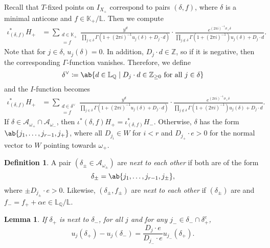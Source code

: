 \documentclass[leqno, openany]{memoir}
\newtheorem{lem}[thm]{Lemma}
\theoremstyle{definition}
\newtheorem{defn}[thm]{Definition}
\theoremstyle{remark}
\theoremstyle{plain}
\theoremstyle{definition}
\theoremstyle{remark}
\newcommand{\Z}{\mathbb{Z}}
\newcommand{\Q}{\mathbb{Q}}
\newcommand{\K}{\mathbb{K}}
\renewcommand{\L}{\mathbb{L}}
\newcommand{\mc}[1]{\mathcal{#1}}
\begin{document}
Recall that $T$-fixed points on $I_{X_+}$ correspond to pairs $(\delta, f)$, where $\delta$ is a minimal anticone and $f \in \K_+/\L$. Then we compute
\begin{align*}
    \iota^*_{(\delta, f)} H_+ &= \sum_{\substack{d \in \K_+ \\ [d] = f}} \frac{y^d}{\prod_{j \in \delta} \Gamma(1 + (2\pi i)^{-1}u_j ( \delta ) + D_j \cdot d)} \cdot \frac{e^{(2\pi i)^{-1} \sigma_+ \delta}}{\prod_{j \notin \delta} \Gamma(1 + (2\pi i)^{-1})u_j(\delta) + D_j \cdot d}.
\end{align*}
Note that for $j \in \delta$, $u_j(\delta) = 0$. In addition, $D_j \cdot d \in \Z$, so if it is negative, then the corresponding $\Gamma$-function vanishes. Therefore, we define
\[ \delta^{\vee} \coloneqq \ab\{d \in \L_{\Q} \mid D_j \cdot d \in \Z_{\geq 0} \text{ for all } j \in \delta\} \]
and the $I$-function becomes
\begin{align*}
    \iota^*_{(\delta, f)} H_+ &= \sum_{\substack{d \in \delta^{\vee} \\ [d] = f}} \frac{y^d}{\prod_{j \in \delta} \Gamma(1 + (2\pi i)^{-1}u_j ( \delta ) + D_j \cdot d)} \cdot \frac{e^{(2\pi i)^{-1} \sigma_+ \delta}}{\prod_{j \notin \delta} \Gamma(1 + (2\pi i)^{-1})u_j(\delta) + D_j \cdot d}.
\end{align*}
If $\delta \in \mc{A}_{\omega_+} \cap \mc{A}_{\omega_-}$, then $\iota^*(\delta,f) H_+ = \iota^*_{(\delta, f)} H_-$. Otherwise, $\delta$ has the form $\ab\{j_1, \ldots, j_{r-1}, j_+ \}$, where all $D_{j_i} \in W$ for $i < r$ and $D_{j_+} \cdot e > 0$ for the normal vector to $W$ pointing towards $\omega_+$.

\begin{defn}
    A pair $(\delta_{\pm} \in \mc{A}_{\omega_{\pm}})$ are \textit{next to each other} if both are of the form
    \[ \delta_{\pm} = \ab\{j_1, \ldots, j_{r-1}, j_{\pm}\}, \]
    where $\pm D_{j_\pm} \cdot e > 0$. Likewise, $(\delta_{\pm}, f_{\pm})$ are \textit{next to each other} if $(\delta_{\pm})$ are and $f_- = f_+ + \alpha e \in \L_{\Q}/\L$.
\end{defn}

\begin{lem}
    If $\delta_+$ is next to $\delta_-$, for all $j$ and for any $j_- \in \delta_- \cap \delta_+^c$, 
    \[ u_j(\delta_+) - u_j(\delta_-) = \frac{D_j \cdot e}{D_{j_-} \cdot e} u_{j_-}(\delta_+). \]
\end{lem}
\end{document}
